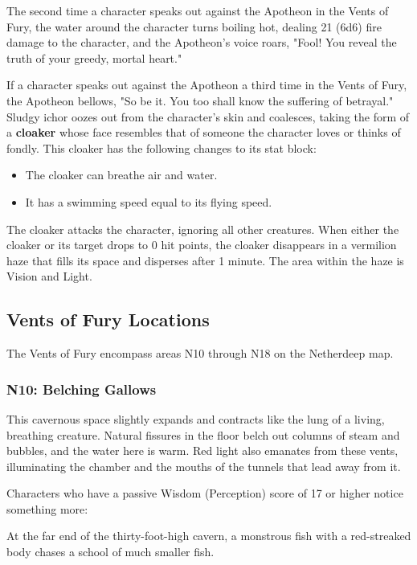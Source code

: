 \documentclass[10pt,a4paper,twoside,fancy,bg=print,twocolumn,openany,nodeprecatedcode]{dndbook}
\begin{document}
The second time a character speaks out against the Apotheon in the Vents of Fury, the water around the character turns boiling hot, dealing 21 (6d6) fire damage to the character, and the Apotheon's voice roars, "Fool! You reveal the truth of your greedy, mortal heart."

If a character speaks out against the Apotheon a third time in the Vents of Fury, the Apotheon bellows, "So be it. You too shall know the suffering of betrayal." Sludgy ichor oozes out from the character's skin and coalesces, taking the form of a \textbf{cloaker} whose face resembles that of someone the character loves or thinks of fondly. This cloaker has the following changes to its stat block:


\begin{itemize}
\item The cloaker can breathe air and water.
\item It has a swimming speed equal to its flying speed.
\end{itemize}

The cloaker attacks the character, ignoring all other creatures. When either the cloaker or its target drops to 0 hit points, the cloaker disappears in a vermilion haze that fills its space and disperses after 1 minute. The area within the haze is Vision and Light.

\subsection{Vents of Fury Locations}
The Vents of Fury encompass areas N10 through N18 on the Netherdeep map.

\subsubsection{N10: Belching Gallows}
\begin{DndReadAloud}{}
This cavernous space slightly expands and contracts like the lung of a living, breathing creature. Natural fissures in the floor belch out columns of steam and bubbles, and the water here is warm. Red light also emanates from these vents, illuminating the chamber and the mouths of the tunnels that lead away from it.

\end{DndReadAloud}

Characters who have a passive Wisdom (Perception) score of 17 or higher notice something more:

\begin{DndReadAloud}{}
At the far end of the thirty-foot-high cavern, a monstrous fish with a red-streaked body chases a school of much smaller fish.

\end{DndReadAloud}
\end{document}
